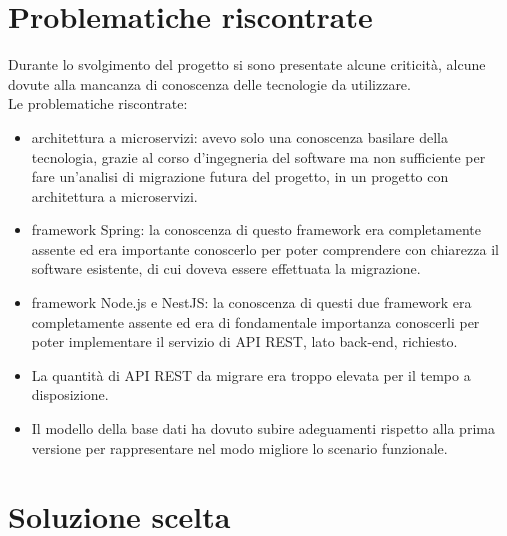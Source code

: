 \section{Problematiche riscontrate}
Durante lo svolgimento del progetto si sono presentate alcune criticità, alcune dovute alla mancanza
di conoscenza delle tecnologie da utilizzare. 
\\
Le problematiche riscontrate:

\begin{itemize}
    \item architettura a microservizi: avevo solo una conoscenza basilare
          della tecnologia, grazie al corso d'ingegneria del software ma non
          sufficiente per fare un'analisi di migrazione futura del progetto, in un progetto con 
          architettura a microservizi.
    \item framework Spring: la conoscenza di questo framework era completamente assente
        ed era importante conoscerlo per poter comprendere con chiarezza il software esistente,
        di cui doveva essere effettuata la migrazione.
    \item framework Node.js e NestJS: la conoscenza di questi due framework era completamente
        assente ed era di fondamentale importanza conoscerli per poter implementare il servizio
        di \gls{API} \gls{REST}, lato back-end, richiesto.
    \item La quantità di \gls{API} \gls{REST} da migrare era troppo elevata per il tempo a disposizione.
    \item Il modello della base dati ha dovuto subire adeguamenti rispetto alla prima versione
        per rappresentare nel modo migliore lo scenario funzionale.
\end{itemize}

\section{Soluzione scelta}

